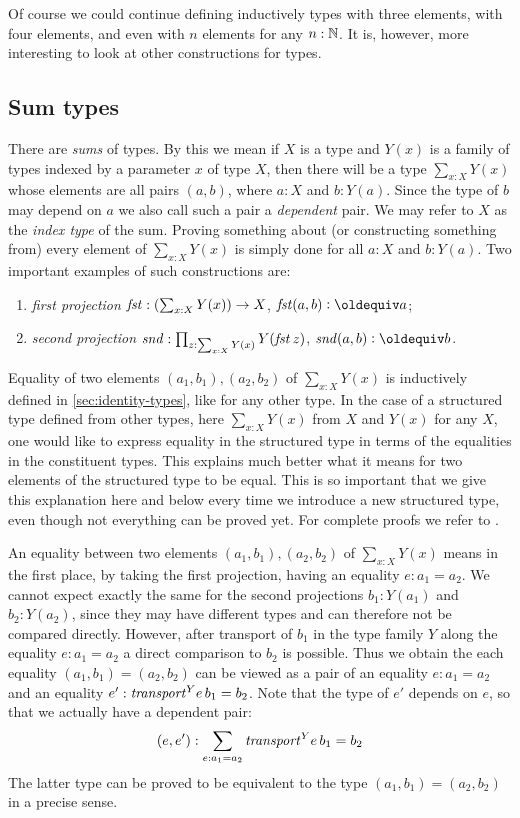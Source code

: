 Of course we could continue defining inductively types with three elements, 
with four elements, and even with $n$ elements for any $n:\mathbb{N}$. It is,
however, more interesting to look at other constructions for types.

\subsection{Sum types}
\label{sec:sum-types}
There are \emph{sums} of types.  By this we mean if $X$ is a type and $Y(x)$ is a family of types indexed by a parameter $x$ of type $X$, then
there will be a type $\sum _{x:X} Y(x)$ whose elements are all pairs $(a,b)$, where $a:X$ and $b:Y(a)$. Since the type of $b$ may depend on $a$ we also call such a pair
a \emph{dependent} pair. We may refer to $X$ as the \emph{index
  type} of the sum.  Proving something about (or constructing something from) every element of $\sum _{x:X} Y(x)$ is simply done for all $a:X$ and $b: Y(a)$.
Two important examples of such constructions are:
\begin{enumerate}
\item \emph{first projection} $\mathop{\mathit{fst}}:(\sum _{x:X} Y(x)) \to X$, 
$\fst(a,b)\defeq a$;
\item \emph{second projection}
$\mathop{\mathit{snd}}: \prod_{z: \sum _{x:X} Y(x)} Y(\mathop{\mathit{fst}} z)$, $\snd(a,b)\defeq b$.
\end{enumerate}

Equality of two elements $(a_1,b_1),(a_2,b_2)$ of $\sum _{x:X} Y(x)$ is 
inductively defined in \cref{sec:identity-types}, like for any other type.
In the case of a structured type defined from other types, 
here $\sum _{x:X} Y(x)$ from $X$ and $Y(x)$ for any $X$,
one would like to express equality in the structured type in terms of 
the equalities in the constituent types. This explains much better
what it means for two elements of the structured type to be equal.
This is so important that we give this explanation here and below
every time we introduce a new structured type, even though not everything
can be proved yet. For complete proofs we refer to \cite{hottbook}.

An equality between two elements $(a_1,b_1),(a_2,b_2)$ of 
$\sum _{x:X} Y(x)$ means in the first place, by taking
the first projection, having an equality $e: a_1=a_2$.
We cannot expect exactly the same for the second 
projections $b_1: Y(a_1)$ and $b_2: Y(a_2)$, since they may
have different types and can therefore not be compared directly.
However, after transport of $b_1$ in the type family $Y$
along the equality $e: a_1=a_2$ a direct comparison to $b_2$
is possible. Thus we obtain the each equality $(a_1,b_1)=(a_2,b_2)$
can be viewed as a pair of an equality $e: a_1=a_2$ and an
equality $e' : \mathord{\mathit{transport}}^Y e\, b_1 = b_2$. Note that the type
of $e'$ depends on $e$, so that we actually have a dependent pair:
\[
(e,e'): \sum_{e:a_1 = a_2} {\mathord{\mathit{transport}}}^Y e\, b_1 = b_2
\]
The latter type can be proved to be equivalent to the
type $(a_1,b_1)=(a_2,b_2)$ in a precise sense.

